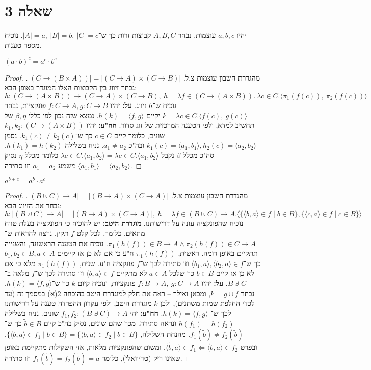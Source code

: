 \documentclass[]{article}
\newcommand\ra    {\rangle}
\newcommand\la    {\langle}
\newcommand\tl    {\tilde}
\begin{document}
	\section*{שאלה 3}
	יהיו $ a, b, c $ עוצמות. נבחר $ A, B, C $ קבוצות זרות כך ש־$ |A| = a, \ |B| = b, \ |C| = c $. נוכיח מספר טענות. 
	\begin{hebenum}[(a)]
		\item $ (a \cdot b)^c = a^c \cdot b^c $
		\begin{proof}
			מהגדרת חשבון עוצמות צ.ל. $ |(C \to (B \times A))| = |(C \to A) \times (C \to B)| $. נבחר זיווג בין הקבוצות האלו המוגדר באופן הבא: 
			\[ h \colon (C \to (A \times B)) \to (C \to A) \times (C \to B), \ h = \lambda f \in (C \to (A \times B)). \ \lambda c \in C. \la \pi_1(f(c)), \ \pi_2(f(c)) \ra \]
			נוכיח ש־$ h $ זיווג. \textbf{על: }יהיו $ f \colon C \to A, g \colon C \to B $ פונקציות, נבחר $ k = \lambda c \in C. \la f(c), \ g(c) \ra $ יקיים $ h(k) = \la f, g \ra $. נמצא שזה נכון לפי כללי $ \beta, \eta  $ של תחשיב למדא, ולפי הטענה המרכזית של זוג סדור. \textbf{חח"ע: }יהיו $ k_1, k_2 \colon (C \to (A \times B)) $ שונים, כלומר קיים $ c \in C $ כך ש־$ k_1(c) \neq k_2(c) $. נסמן $ k_1(c) = \la a_1, b_1 \ra, h_2(c) = \la a_2, b_2 \ra $ ובה"כ $ a_1 \neq a_2 $. נניח בשלילה $ h(k_1) = h(k_2) $. סה"כ מכלל $ \beta $ נקבל $ \lambda c \in C. \la a_1, b_2 \ra = \lambda c \in C. \la a_1, b_2 \ra  $ כלומר מכלל $ \eta $ נסיק $ \la a_1, b_1 \ra = \la a_2, b_2 \ra $ משמע $ a_1 = a_2 $ וזו סתירה. 
		\end{proof}
		\item $ a^{b + c}  = a^b \cdot a^c $ \begin{proof}
			מהגדרת חשבון עוצמות צ.ל. 
			$ |(B \uplus C) \to A| = |(B \to A) \times (C \to A)| $. נבחר את הזיווג הבא: 
			\[ h \colon |(B \uplus C) \to A| = |(B \to A) \times (C \to A)|, \ h = \lambda f \in (B \uplus C) \to A. \big \la \{\la b, a \ra \in f \mid b \in B\}, \{\la c, a \ra \in f \mid c \in B \} \big \ra \]
			נוכיח שהפונקציה עונה על דרישותנו. \textbf{מוגדרת היטב: }יש להוכיח כי הפונקציה בעלת טווח מתאים, כלומר, לכל קלט $ f $ תקין, נרצה להראות ש־$ \pi_1(h(f)) \in B \to A \land \pi_2(h(f)) \in C \to A $. נוכיח את הטענה הראשונה, והשנייה תתקיים באופן דומה. ראשית, $ \pi_1(h(f)) $ ח"ע כי אם לא כן אז קיימים $ b_1, b_2 \in B, a \in A $ כך ש־$ \la b_1, a \ra, \la b_2, a \ra \in f $ וזו סתירה לכך ש־$ f $ פונקציה ח"ע. שנית, $ \pi_1(h(f)) $ מלא כי אם לא כן אז קיים $ b \in B $ כך שלכל $ a \in A $ לא מתקיים $ \la b, a \ra \in f $ וזו סתירה לכך ש־$ f $ מלאה ב־$ B \uplus C $. \textbf{על: }יהיו $ f \colon B \to A, \ g \colon C \to A $ פונקציות, ונוכיח קיום $ k $ כך ש־$ h(k) = \la f, g \ra $. נבחר $ k = g \cup f $, ומכאן ואילך – ראה את חלק למוגדרת היטב בהוכחה 2(א) במסמך זה (עד לכדי החלפת שמות משתנים), ולכן $ k $ מוגדרת היטב, ולפי עקרון ההפרדה טענה על דרישותנו לכך ש־ $ h(k) = \la f, g \ra $. \textbf{חח"ע: }יהי $ f_1, f_2 \colon (B \uplus C) \to A $ שונים. נניח בשלילה $ h(f_1) = h(f_2) $ ונראה סתירה. מכך שהם שונים, נסיק בה"כ קיום $ \tl b \in B $ כך ש־$ f_1(\tl b) \neq f_2(\tl b) $. מהנחת השלילה, $ \{\la b, a \ra \in f_1 \mid b \in B\} = \{\la b, a \ra \in f_2 \mid b \in B\} $, ובפרט $ \la \tl b, a \ra \in f_1 \iff \la \tl b, a \ra \in f_2 $, ומשום שהפונקציות מלאות, אזי השקילות מתקיימת באופן שאינו ריק (טריוואלי), כלומר $ f_1(\tl b) = f_2(\tl b) = a $ וזו סתירה. 

\end{proof}
\end{hebenum}
\end{document}
